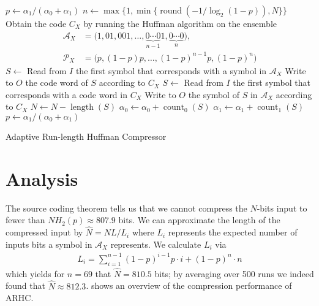 \documentclass[letterpaper,11pt]{extarticle}
\begin{document}
\begin{algorithm}[ht]
    \begin{algorithmic}[1]
         
                \State $p \gets \alpha_1 / (\alpha_0 + \alpha_1)$
            \EndIf
                \State $n \gets \max\{1,\min\{\operatorname{round}(-1/\log_2 (1 - p)) , N\}\}$
                \State Obtain the code $C_X$ by running the Huffman algorithm on the ensemble \begin{align*}
                    \mathcal{A}_X &= \big(1, 01, 001, \ldots, \underbrace{0\cdots0}_{n-1}\!1, \underbrace{0\cdots0}_{n} \big), \\
                    \mathcal{P}_X &= \big( p, (1-p)p, \ldots, (1-p)^{n-1}p, (1-p)^n \big)
                \end{align*}
                    \State $S \gets$ Read from $I$ the first symbol that corresponds with a symbol in $\mathcal{A}_X$
                    \State Write to $O$ the code word of $S$ according to $C_X$
                    \State $S \gets$ Read from $I$ the first symbol that corresponds with a code word in $C_X$
                    \State Write to $O$ the symbol of $S$ in $\mathcal{A}_X$ according to $C_X$
                \EndIf
                \State $N \gets N - \operatorname{length}(S)$
                    \State $\alpha_0 \gets \alpha_0 + \operatorname{count}_0(S)$
                    \State $\alpha_1 \gets \alpha_1 + \operatorname{count}_1(S)$
                    \State $p \gets \alpha_1 / (\alpha_0 + \alpha_1)$
                \EndIf
            \EndWhile
        \EndFunction
    \end{algorithmic}
    \caption{Adaptive Run-length Huffman Compressor}
    \label{alg:pseudo}
\end{algorithm}

\section{Analysis}
\label{sec:analysis}
The source coding theorem tells us that we cannot compress the $N$-bits input to fewer than $NH_2(p)\approx807.9$ bits. We can approximate the length of the compressed input by $\hat{N}=NL/L_i$ where $L_i$ represents the expected number of inputs bits a symbol in $\mathcal{A}_X$ represents. We calculate $L_i$ via
\begin{align*}
    L_i = \sum_{i=1}^{n-1}(1-p)^{i-1}p\cdot i +(1-p)^n\cdot n
\end{align*}
which yields for $n=69$ that $\hat{N}=810.5$ bits; by averaging over 500 runs we indeed found that $\hat{N}\approx 812.3$.  shows an overview of the compression performance of ARHC.
\end{document}
